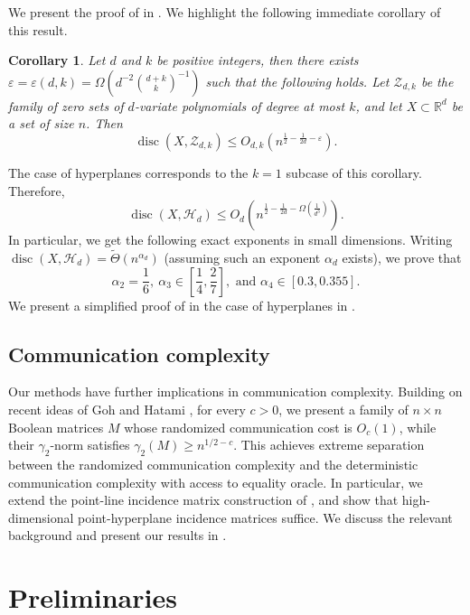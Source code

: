 \documentclass[11pt]{article}
\theoremstyle{plain}
\newtheorem{corollary}[theorem]{Corollary}
\theoremstyle{definition}
\newcommand{\eps}{\varepsilon}
\DeclareMathOperator{\disc}{disc}
\begin{document}
	We present the proof of  in . We highlight the following immediate corollary of this result.
	
	\begin{corollary}
		Let $d$ and $k$ be positive integers, then there exists $\eps=\eps(d,k)=\Omega(d^{-2}\binom{d+k}{k}^{-1})$ such that the following holds. Let $\mathcal{Z}_{d,k}$ be the family of zero sets of $d$-variate polynomials of degree at most $k$, and let $X\subset \mathbb{R}^d$ be a set of size $n$. Then
		$$\disc(X,\mathcal{Z}_{d,k})\leq O_{d,k}\left(n^{\frac{1}{2}-\frac{1}{2d}-\eps}\right).$$
	\end{corollary}
	
	\noindent
	The case of hyperplanes corresponds to the $k=1$ subcase of this corollary. Therefore, 
	$$\disc(X,\mathcal{H}_d)\leq O_{d}\left(n^{\frac{1}{2}-\frac{1}{2d}-\Omega(\frac{1}{d^3})}\right).$$
	In particular, we get the following exact exponents in small dimensions. Writing $\disc(X,\mathcal{H}_d)=\tilde{\Theta}(n^{\alpha_d})$ (assuming such an exponent $\alpha_d$ exists), we prove that 
	$$\alpha_2=\frac{1}{6},\ \alpha_3\in \left[\frac{1}{4},\frac{2}{7}\right],\text{ and }\alpha_4\in \left[0.3,0.355\right].$$ 
    We present a simplified proof of  in the case of hyperplanes in .

	\subsection{Communication complexity} 
    
    Our methods have further implications in communication complexity. Building on recent ideas of Goh and Hatami \cite{GH_totally_real}, for every $c>0$, we present a family of $n\times n$ Boolean matrices $M$ whose randomized communication cost is $O_c(1)$, while their $\gamma_2$-norm satisfies $\gamma_2(M)\geq n^{1/2-c}$. This achieves extreme separation between the randomized communication complexity and the deterministic communication complexity with access to equality oracle. In particular, we extend the point-line incidence matrix construction of \cite{GH_totally_real}, and show that high-dimensional point-hyperplane incidence matrices suffice. We discuss the relevant background and present our results in .
	
	\section{Preliminaries}\label{sect:prelim}
	
\end{document}
